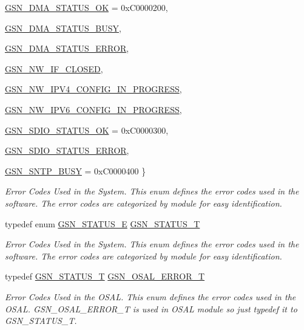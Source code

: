 \begin{DoxyCompactItemize}
\par
\hyperlink{a00659_gga476ae1caf992f8287176b2cc414c8707a3c45c26b1877d1d7634c0abc3d11183b}{GSN\_\-DMA\_\-STATUS\_\-OK} =  0xC0000200, 
\par
\hyperlink{a00659_gga476ae1caf992f8287176b2cc414c8707a90fcdff06b4ecb1e25f8cc4487015a0e}{GSN\_\-DMA\_\-STATUS\_\-BUSY}, 
\par
\hyperlink{a00659_gga476ae1caf992f8287176b2cc414c8707a434f62dca4f16b8ae560e91a3ce209a4}{GSN\_\-DMA\_\-STATUS\_\-ERROR}, 
\par
\hyperlink{a00659_gga476ae1caf992f8287176b2cc414c8707a5aa7e4499d893c43f068448558ffcac7}{GSN\_\-NW\_\-IF\_\-CLOSED}, 
\par
\hyperlink{a00659_gga476ae1caf992f8287176b2cc414c8707aa43bf552ed9aee790552b1805eb525cd}{GSN\_\-NW\_\-IPV4\_\-CONFIG\_\-IN\_\-PROGRESS}, 
\par
\hyperlink{a00659_gga476ae1caf992f8287176b2cc414c8707ac151d4d3b71542ed8b8c6e218efb47a3}{GSN\_\-NW\_\-IPV6\_\-CONFIG\_\-IN\_\-PROGRESS}, 
\par
\hyperlink{a00659_gga476ae1caf992f8287176b2cc414c8707ad280f6a2f89e50934e488964f06bf1c0}{GSN\_\-SDIO\_\-STATUS\_\-OK} =  0xC0000300, 
\par
\hyperlink{a00659_gga476ae1caf992f8287176b2cc414c8707ad4a9b0b4eda759e9da615ff11aa037e2}{GSN\_\-SDIO\_\-STATUS\_\-ERROR}, 
\par
\hyperlink{a00659_gga476ae1caf992f8287176b2cc414c8707aaff7e73f13814d77b99071d629394f0b}{GSN\_\-SNTP\_\-BUSY} =  0xC0000400
 \}
\begin{DoxyCompactList}\small\item\em Error Codes Used in the System. This enum defines the error codes used in the software. The error codes are categorized by module for easy identification. \end{DoxyCompactList}\item 
typedef enum \hyperlink{a00659_ga476ae1caf992f8287176b2cc414c8707}{GSN\_\-STATUS\_\-E} \hyperlink{a00659_gae36517c0f5872426a7034c9551eb96ac}{GSN\_\-STATUS\_\-T}
\begin{DoxyCompactList}\small\item\em Error Codes Used in the System. This enum defines the error codes used in the software. The error codes are categorized by module for easy identification. \end{DoxyCompactList}\item 
typedef \hyperlink{a00659_gae36517c0f5872426a7034c9551eb96ac}{GSN\_\-STATUS\_\-T} \hyperlink{a00659_ga36216a7aacd1d5024bc7b8bf39c3f46b}{GSN\_\-OSAL\_\-ERROR\_\-T}
\begin{DoxyCompactList}\small\item\em Error Codes Used in the OSAL. This enum defines the error codes used in the OSAL. GSN\_\-OSAL\_\-ERROR\_\-T is used in OSAL module so just typedef it to GSN\_\-STATUS\_\-T. \end{DoxyCompactList}\end{DoxyCompactItemize}


